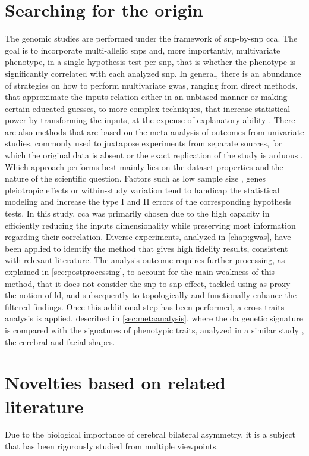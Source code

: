 \section{Searching for the origin}
The genomic studies are performed under the framework of \ac{snp}-by-\ac{snp} \ac{cca}. The goal is to incorporate multi-allelic \acp{snp} and, more importantly, multivariate phenotype, in a single hypothesis test per \ac{snp}, that is whether the phenotype is significantly correlated with each analyzed \ac{snp}. In general, there is an abundance of strategies on how to perform multivariate \ac{gwas}, ranging from direct methods, that approximate the inputs relation either in an unbiased manner or making certain educated guesses, to more complex techniques, that increase statistical power by transforming the inputs, at the expense of explanatory ability \cite{Galesloot2014}. There are also methods that are based on the meta-analysis of outcomes from univariate studies, commonly used to juxtapose experiments from separate sources, for which the original data is absent or the exact replication of the study is arduous \cite{Cichonska2016}. Which approach performs best mainly lies on the dataset properties and the nature of the scientific question. Factors such as low sample size \cite{Sheng2021}, genes pleiotropic effects \cite{Fernandes2021} or within-study variation \cite{Jackson2011} tend to handicap the statistical modeling and increase the type I and II errors of the corresponding hypothesis tests. In this study, \ac{cca} was primarily chosen due to the high capacity in efficiently reducing the inputs dimensionality while preserving most information regarding their correlation. Diverse experiments, analyzed in \autoref{chap:gwas}, have been applied to identify the method that gives high fidelity results, consistent with relevant literature. The analysis outcome requires further processing, as explained in \autoref{sec:postprocessing}, to account for the main weakness of this method, that it does not consider the \ac{snp}-to-\ac{snp} effect, tackled using as proxy the notion of \ac{ld}, and subsequently to topologically and functionally enhance the filtered findings. Once this additional step has been performed, a cross-traits analysis is applied, described in \autoref{sec:metaanalysis}, where the \ac{da} genetic signature is compared with the signatures of phenotypic traits, analyzed in a similar study \cite{Naqvi2021}, the cerebral and facial shapes.


\section{Novelties based on related literature} 
 Due to the biological importance of cerebral bilateral asymmetry, it is a subject that has been rigorously studied from multiple viewpoints.
